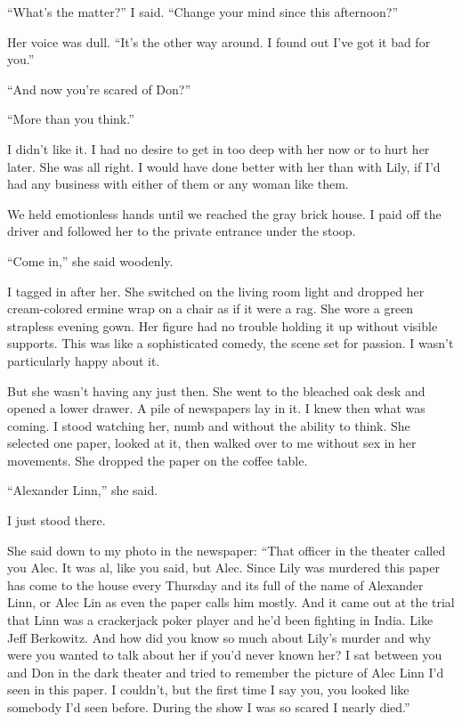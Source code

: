 \documentclass{novel}
\begin{document}
“What’s the matter?” I said. “Change your mind since this afternoon?”

Her voice was dull. “It’s the other way around. I found out I’ve got it bad for you.”

“And now you’re scared of Don?”

“More than you think.”

I didn’t like it. I had no desire to get in too deep with her now or to hurt her later. She was all right. I would have done better with her than with Lily, if I’d had any business with either of them or any woman like them.

We held emotionless hands until we reached the gray brick house. I paid off the driver and followed her to the private entrance under the stoop.

“Come in,” she said woodenly.

I tagged in after her. She switched on the living room light and dropped her cream-colored ermine wrap on a chair as if it were a rag. She wore a green strapless evening gown. Her figure had no trouble holding it up without visible supports. This was like a sophisticated comedy, the scene set for passion. I wasn’t particularly happy about it.

But she wasn’t having any just then. She went to the bleached oak desk and opened a lower drawer. A pile of newspapers lay in it. I knew then what was coming. I stood watching her, numb and without the ability to think. She selected one paper, looked at it, then walked over to me without sex in her movements. She dropped the paper on the coffee table.

“Alexander Linn,” she said.

\scenestars

I just stood there.

She said down to my photo in the newspaper: “That officer in the theater called you Alec. It was al, like you said, but Alec. Since Lily was murdered this paper has come to the house every Thursday and its full of the name of Alexander Linn, or Alec Lin as even the paper calls him mostly. And it came out at the trial that Linn was a crackerjack poker player and he’d been fighting in India. Like Jeff Berkowitz. And how did you know so much about Lily’s murder and why were you wanted to talk about her if you’d never known her? I sat between you and Don in the dark theater and tried to remember the picture of Alec Linn I’d seen in this paper. I couldn’t, but the first time I say you, you looked like somebody I’d seen before. During the show I was so scared I nearly died.”
\end{document}

